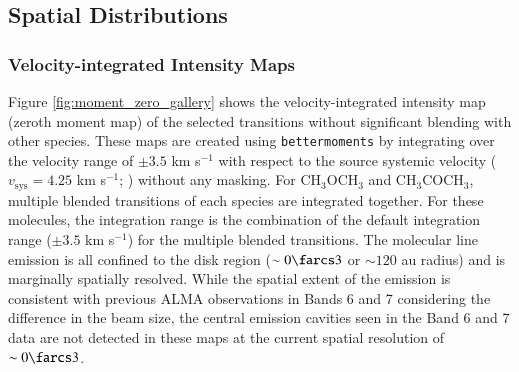 \documentclass[twocolumn, twocolappendix, astrosymb, times]{aastex631}
\newcommand{\methanol}{CH$_3$OH\xspace}
\newcommand{\acetaldehyde}{CH$_3$CHO\xspace}
\newcommand{\methylformate}{CH$_3$OCHO\xspace}
\newcommand{\dimethylether}{CH$_3$OCH$_3$\xspace}
\newcommand{\acetone}{CH$_3$COCH$_3$\xspace}
\begin{document}




\subsection{Spatial Distributions}
\subsubsection{Velocity-integrated Intensity Maps}
Figure \ref{fig:moment_zero_gallery} shows the velocity-integrated intensity map (zeroth moment map) of the selected transitions without significant blending with other species. These maps are created using \texttt{bettermoments} \citep{bettermoments} by integrating over the velocity range of $\pm3.5$ km s$^{-1}$ with respect to the source systemic velocity ($v_\mathrm{sys} = 4.25$ km s$^{-1}$; \citealt{Tobin2023}) without any masking. For \dimethylether and \acetone, multiple blended transitions of each species are integrated together. For these molecules, the integration range is the combination of the default integration range ($\pm3.5$ km s$^{-1}$) for the multiple blended transitions. The molecular line emission is all confined to the disk region ($\sim0\farcs3$ or $\sim120$ au radius) and is marginally spatially resolved. While the spatial extent of the emission is consistent with previous ALMA observations in Bands 6 and 7 \citep{vantHoff2018, Lee2019, Tobin2023} considering the difference in the beam size, the central emission cavities seen in the Band 6 and 7 data are not detected in these maps at the current spatial resolution of $\sim0\farcs3$.
\end{document}
